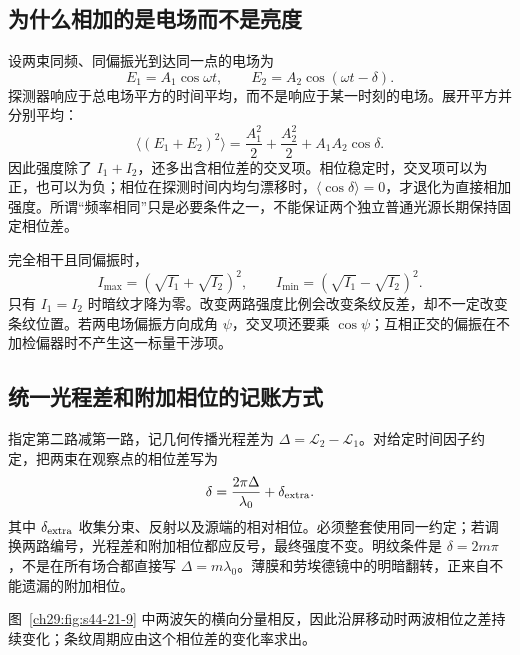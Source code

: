 \subsection{为什么相加的是电场而不是亮度}
设两束同频、同偏振光到达同一点的电场为
\[
 E_1=A_1\cos\omega t,\qquad E_2=A_2\cos(\omega t-\delta).
\]
探测器响应于总电场平方的时间平均，而不是响应于某一时刻的电场。展开平方并分别平均：
\[
 \langle(E_1+E_2)^2\rangle
 =\frac{A_1^2}2+\frac{A_2^2}2+A_1A_2\cos\delta.
\]
因此强度除了 $I_1+I_2$，还多出含相位差的交叉项。相位稳定时，交叉项可以为正，也可以为负；相位在探测时间内均匀漂移时，$\langle\cos\delta\rangle=0$，才退化为直接相加强度。所谓“频率相同”只是必要条件之一，不能保证两个独立普通光源长期保持固定相位差。

完全相干且同偏振时，
\[
 I_{\max}=(\sqrt{I_1}+\sqrt{I_2})^2,\qquad
 I_{\min}=(\sqrt{I_1}-\sqrt{I_2})^2.
\]
只有 $I_1=I_2$ 时暗纹才降为零。改变两路强度比例会改变条纹反差，却不一定改变条纹位置。若两电场偏振方向成角 $\psi$，交叉项还要乘 $\cos\psi$；互相正交的偏振在不加检偏器时不产生这一标量干涉项。

\subsection{统一光程差和附加相位的记账方式}
指定第二路减第一路，记几何传播光程差为 $\Delta=\mathcal L_2-\mathcal L_1$。对给定时间因子约定，把两束在观察点的相位差写为
\[
 \delta=\frac{2\pi\Delta}{\lambda_0}+\delta_{\rm extra}.
\]
其中 $\delta_{\rm extra}$ 收集分束、反射以及源端的相对相位。必须整套使用同一约定；若调换两路编号，光程差和附加相位都应反号，最终强度不变。明纹条件是 $\delta=2m\pi$，不是在所有场合都直接写 $\Delta=m\lambda_0$。薄膜和劳埃德镜中的明暗翻转，正来自不能遗漏的附加相位。


\PlaneWaveDiagram
图~\ref{ch29:fig:s44-21-9} 中两波矢的横向分量相反，因此沿屏移动时两波相位之差持续变化；条纹周期应由这个相位差的变化率求出。


